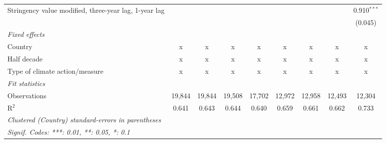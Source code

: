 \begin{table}[htbp]
\begin{tabular}{lcccccccc}
      Stringency value modified, three-year lag, 1-year lag                           &               &              &              &              &               &               &               & 0.910$^{***}$\\   
                                                                                      &               &              &              &              &               &               &               & (0.045)\\   
      \emph{Fixed effects}\\
      Country                                                                         & x             & x            & x            & x            & x             & x             & x             & x\\  
      Half decade                                                                     & x             & x            & x            & x            & x             & x             & x             & x\\  
      Type of climate action/measure                                                  & x             & x            & x            & x            & x             & x             & x             & x\\  
      \midrule \emph{Fit statistics}\\
      Observations                                                                    & 19,844        & 19,844       & 19,508       & 17,702       & 12,972        & 12,958        & 12,493        & 12,304\\  
      R$^2$                                                                           & 0.641         & 0.643        & 0.644        & 0.640        & 0.659         & 0.661         & 0.662         & 0.733\\  
      \midrule
      \multicolumn{9}{l}{\emph{Clustered (Country) standard-errors in parentheses}}\\
      \multicolumn{9}{l}{\emph{Signif. Codes: ***: 0.01, **: 0.05, *: 0.1}}\\
   \end{tabular}
\end{table}


